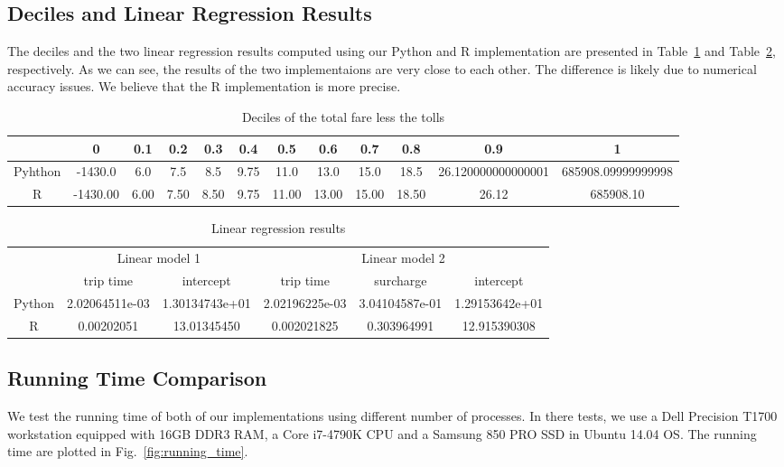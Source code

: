 \documentclass{article}
\begin{document}
\subsection{Deciles and Linear Regression Results}
The deciles and the two linear regression results computed using our Python and
R implementation are presented in Table~\ref{tab:decile} and Table~\ref{tab:lm},
respectively. As we can see, the results of the two implementaions are very
close to each other. The difference is likely due to numerical accuracy issues.
We believe that the R implementation is more precise.

\begin{table}[!t]
    \renewcommand{\arraystretch}{1.3}
    \caption{Deciles of the total fare less the tolls}
    \label{tab:decile}
    \centering
    \begin{tabular}{c|ccccccccccc}
        \hline
         & 0 & 0.1 & 0.2 & 0.3 & 0.4 & 0.5 & 0.6 & 0.7 & 0.8 & 0.9 & 1 \\
         \hline
        Pyhthon & -1430.0 & 6.0 & 7.5 & 8.5 & 9.75 & 11.0 & 13.0 & 15.0 & 18.5 &
        26.120000000000001 & 685908.09999999998 \\
        R & -1430.00 & 6.00 & 7.50 & 8.50 & 9.75 & 11.00 & 13.00 & 15.00 & 18.50
        & 26.12 & 685908.10 \\
        \hline
    \end{tabular}
\end{table}

\begin{table}[!t]
    \renewcommand{\arraystretch}{1.3}
    \caption{Linear regression results}
    \label{tab:lm}
    \centering
    \begin{tabular}{c|cc|ccc}
        \hline
        \multirow{2}{*}{} & \multicolumn{2}{c|}{Linear model 1} &
        \multicolumn{3}{c}{Linear model 2} \\
        \hhline{~-----} & trip time & intercept & trip time & surcharge &
        intercept \\
        \hline
        Python & 2.02064511e-03   & 1.30134743e+01 &  2.02196225e-03 &
        3.04104587e-01 & 1.29153642e+01 \\
        R & 0.00202051 & 13.01345450 & 0.002021825 & 0.303964991 & 12.915390308
        \\
        \hline
    \end{tabular}
\end{table}

\subsection{Running Time Comparison}
We test the running time of both of our implementations using different number
of processes. In there tests, we use a Dell Precision T1700 workstation equipped
with 16GB DDR3 RAM, a Core i7-4790K CPU and a Samsung 850 PRO SSD in Ubuntu
14.04 OS. The running time are plotted in Fig.~\ref{fig:running_time}.
\end{document}
